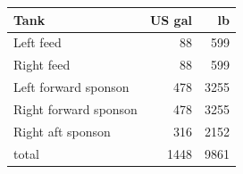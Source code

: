 \begin{tabular}{@{}lrr@{}}
\toprule
Tank & US gal & lb \\
\midrule
Left feed & 88 & 599 \\
Right feed & 88 & 599 \\
Left forward sponson & 478 & 3255 \\
Right forward sponson & 478 & 3255 \\
Right aft sponson & 316 & 2152 \\
\midrule total & 1448 & 9861 \\
\bottomrule
\end{tabular}
